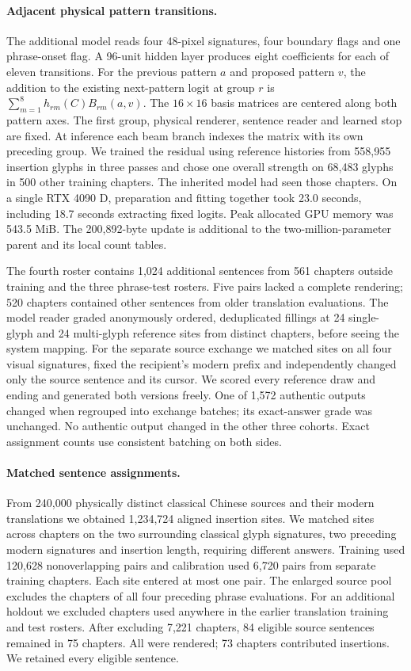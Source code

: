 \documentclass[12pt,a4paper]{article}
\providecommand{\DIFadd}[1]{{\protect\color{blue} \sf #1}} %
\begin{document}
\paragraph{\DIFadd{Adjacent physical pattern transitions.}}
\DIFadd{The additional model reads four 48-pixel signatures, four boundary flags and one phrase-onset flag. A 96-unit hidden layer produces eight coefficients for each of eleven transitions. For the previous pattern $a$ and proposed pattern $v$, the addition to the existing next-pattern logit at group $r$ is $\sum_{m=1}^{8} h_{rm}(C) B_{rm}(a,v)$. The $16\times16$ basis matrices are centered along both pattern axes. The first group, physical renderer, sentence reader and learned stop are fixed. At inference each beam branch indexes the matrix with its own preceding group. We trained the residual using reference histories from 558,955 insertion glyphs in three passes and chose one overall strength on 68,483 glyphs in 500 other training chapters. The inherited model had seen those chapters. On a single RTX 4090 D, preparation and fitting together took 23.0 seconds, including 18.7 seconds extracting fixed logits. Peak allocated GPU memory was 543.5 MiB. The 200,892-byte update is additional to the two-million-parameter parent and its local count tables.
}

\DIFadd{The fourth roster contains 1,024 additional sentences from 561 chapters outside training and the three phrase-test rosters. Five pairs lacked a complete rendering; 520 chapters contained other sentences from older translation evaluations. The model reader graded anonymously ordered, deduplicated fillings at 24 single-glyph and 24 multi-glyph reference sites from distinct chapters, before seeing the system mapping. For the separate source exchange we matched sites on all four visual signatures, fixed the recipient's modern prefix and independently changed only the source sentence and its cursor. We scored every reference draw and ending and generated both versions freely. One of 1,572 authentic outputs changed when regrouped into exchange batches; its exact-answer grade was unchanged. No authentic output changed in the other three cohorts. Exact assignment counts use consistent batching on both sides.
}

\paragraph{\DIFadd{Matched sentence assignments.}}
\DIFadd{From 240,000 physically distinct classical Chinese sources and their modern translations we obtained 1,234,724 aligned insertion sites. We matched sites across chapters on the two surrounding classical glyph signatures, two preceding modern signatures and insertion length, requiring different answers. Training used 120,628 nonoverlapping pairs and calibration used 6,720 pairs from separate training chapters. Each site entered at most one pair. The enlarged source pool excludes the chapters of all four preceding phrase evaluations. For an additional holdout we excluded chapters used anywhere in the earlier translation training and test rosters. After excluding 7,221 chapters, 84 eligible source sentences remained in 75 chapters. All were rendered; 73 chapters contributed insertions. We retained every eligible sentence.
}
\end{document}

